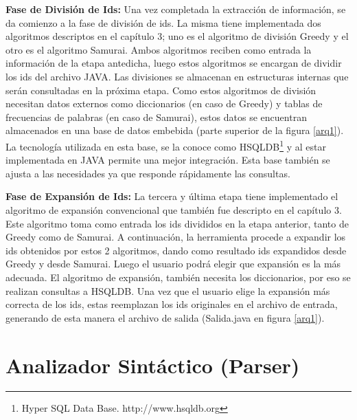 \documentclass[a4paper,12pt]{report}
\begin{document}
\textbf{Fase de División de Ids:} Una vez completada la extracción de información, se da comienzo a la fase de división de ids. La misma tiene implementada dos algoritmos descriptos en el capítulo 3; uno es el algoritmo de división Greedy y el otro es el algoritmo Samurai. Ambos algoritmos reciben como entrada la información de la etapa antedicha, luego estos algoritmos se encargan de dividir los ids del archivo JAVA. Las divisiones se almacenan en estructuras internas que serán consultadas en la próxima etapa. Como estos algoritmos de división necesitan datos externos como diccionarios (en caso de Greedy) y tablas de frecuencias de palabras (en caso de Samurai), estos datos se encuentran almacenados en una base de datos embebida (parte superior de la figura \ref{arq1}). La tecnología utilizada en esta base, se la conoce como HSQLDB\footnote[1]{Hyper SQL Data Base. http://www.hsqldb.org} y al estar implementada en JAVA permite una mejor integración. Esta base también se ajusta a las necesidades ya que responde rápidamente las consultas.

\textbf{Fase de Expansión de Ids:} La tercera y última etapa tiene implementado el algoritmo de expansión convencional que también fue descripto en el capítulo 3. Este algoritmo toma como entrada los ids divididos en la etapa anterior, tanto de Greedy como de Samurai. A continuación, la herramienta procede a expandir los ids obtenidos por estos 2 algoritmos, dando como resultado ids expandidos desde Greedy y desde Samurai. Luego el usuario podrá elegir que expansión es la más adecuada. El algoritmo de expansión, también necesita los diccionarios, por eso se realizan consultas a HSQLDB. Una vez que el usuario elige la expansión más correcta de los ids, estas reemplazan los ids originales en el archivo de entrada, generando de esta manera el archivo de salida (Salida.java en figura \ref{arq1}).

\section{Analizador Sintáctico (Parser)}
\end{document}
